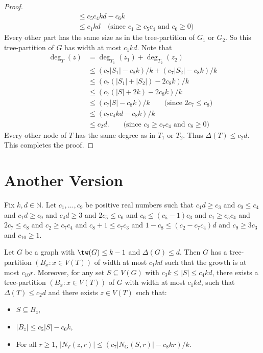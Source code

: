 \begin{proof}
\begin{align*}
    & \leq c_5 c_4 kd - c_6 k \\
    & \leq c_1 kd \quad \text{(since $c_1 \geq c_5c_4$ and $c_6\geq 0$)}
\end{align*}
Every other part has the same size as in the tree-partition of $G_1$ or $G_2$. So this tree-partition of $G$ has width at most $c_1kd$. 
Note that 
\begin{align*}
 \deg_T(z)  & = \deg_{T_1}(z_1) + \deg_{T_2}(z_2)\\
    & \leq  (c_7|S_1|-c_8k)/k + (c_7|S_2|-c_8k)/k\\
    & \leq  (c_7(|S_1|+|S_2|)-2c_8k)/k\\
    & \leq  (c_7(|S|+2k)-2c_8k)/k\\
    & \leq  (c_7|S|-c_8k)/k \qquad \text{(since $2c_7  \leq  c_8$)}\\
    & \leq  (c_7c_4kd-c_8k)/k \\
    & \leq  c_2 d. \qquad \text{(since $c_2 \geq c_7c_4$ and $c_8 \geq 0$)}
\end{align*}
Every other node of $T$ has the same degree as in $T_1$ or $T_2$. 
Thus $\Delta(T) \leq c_2d$. This completes the proof.
\end{proof}



\section{Another Version}

\begin{lem}
Fix $k,d\in\mathbb{N}$. 
Let $c_1,\dots,c_9$ be positive real numbers such that $c_1d \geq c_3$ and
$c_9\leq c_4$ and
$c_1d\geq c_9$ and $c_4 d\geq 3$ and $2 c_5 \leq c_6 $ and 
$c_6 \leq (c_5-1) c_3$ and $c_1\geq c_5c_4$ and $2c_7  \leq  c_8$ and
$c_2 \geq c_7c_4$ and $c_8+1 \leq c_7 c_3  $ and 
$1- c_8  \leq (c_2-c_7 c_4)d$ and $ c_9 \geq 3c_3$ and
$c_10\geq 1$. 

Let $G$ be a graph with $\tw(G)\leq k-1$ and $\Delta(G)\leq d$.
Then $G$ has a tree-partition $(B_x:x\in V(T))$ of width at most $c_1kd$ such that the growth is at most $c_10r$. 
Moreover, for any set $S\subseteq V(G)$ with $c_3 k\leq|S| \leq c_4 kd$, there exists a tree-partition $(B_x:x\in V(T))$ of $G$ with width at most $c_1 kd$, such that $\Delta(T)\leq c_2d$ 
 and there exists $z\in V(T)$ such that:
\begin{itemize}
    \item $S\subseteq B_z$, 
    \item $|B_z|\leq c_5|S|-c_6k$,
    \item For all $r\geq 1$, $|N_T(z,r)|\leq ( c_7 |N_G(S,r)| - c_8 k r)/k$. 
\end{itemize}
\end{lem}

